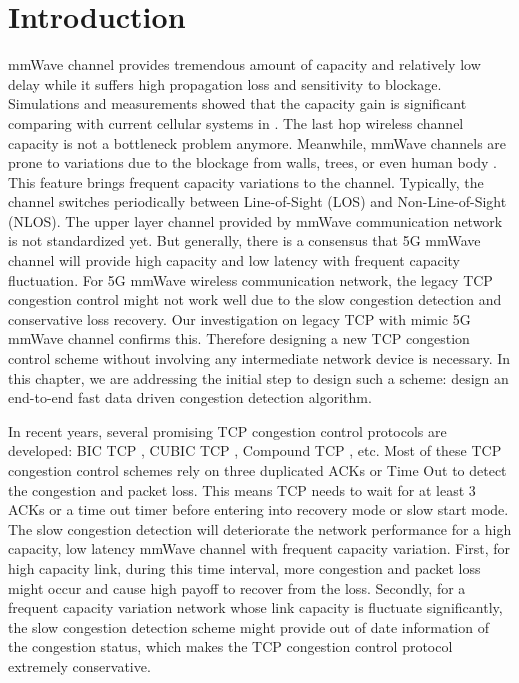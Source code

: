 \section{Introduction}
\par  mmWave channel provides tremendous amount of capacity and relatively low delay while it suffers high propagation loss and sensitivity to blockage. Simulations and measurements showed that the capacity gain is significant comparing with current cellular systems in \cite{akdeniz2014millimeter,bai2015coverage}. The last hop wireless channel capacity is not a bottleneck problem anymore. Meanwhile, mmWave channels are prone to variations due to the blockage from walls, trees, or even human body \cite{lu2012modeling, zhao201328, alejos2008measurement}. This feature brings frequent capacity variations to the channel. Typically, the channel switches periodically between Line-of-Sight (LOS) and Non-Line-of-Sight (NLOS). The upper layer channel provided by mmWave communication network is not standardized yet. But generally, there is a consensus that 5G mmWave channel will provide high capacity and low latency with frequent capacity fluctuation. For 5G mmWave wireless communication network, the legacy TCP congestion control might not work well due to the slow congestion detection and conservative loss recovery. Our investigation on legacy TCP with mimic 5G mmWave channel confirms this. Therefore designing a new TCP congestion control scheme without involving any intermediate network device is necessary. In this chapter, we are addressing the initial step to design such a scheme: design an end-to-end fast data driven congestion detection algorithm.
\par In recent years, several promising TCP congestion control protocols are developed: BIC TCP \cite{xu2004binary}, CUBIC TCP \cite{ha2008cubic}, Compound TCP \cite{tan2006compound}, etc. Most of these TCP congestion control schemes rely on three duplicated ACKs or Time Out to detect the congestion and packet loss. This means TCP needs to wait for at least 3 ACKs or a time out timer before entering into recovery mode or slow start mode. The slow congestion detection will deteriorate the network performance for a high capacity, low latency mmWave channel with frequent capacity variation. First, for high capacity link, during this time interval, more congestion and packet loss might occur and cause high payoff to recover from the loss. Secondly, for a frequent capacity variation network whose link capacity is fluctuate significantly, the slow congestion detection scheme might provide out of date information of the congestion status, which makes the TCP congestion control protocol extremely conservative.
